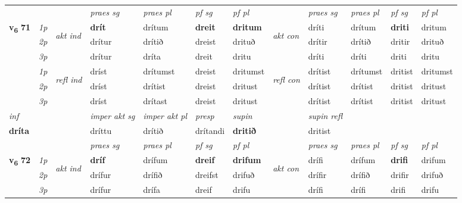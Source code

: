 \begin{longtable}[l]{X>{\footnotesize\itshape}llXXXXlXXXX}
   \midrule
 & &   & \textit{praes sg}  & \textit{praes pl}    & \textit{ pf sg} & \textit{pf pl} & & \textit{praes sg}  & \textit{praes pl}    & \textit{pf sg} & \textit{pf pl }  \\ \cmidrule{4-7} \cmidrule{9-12}
 \multirow{2}{*}{{{\textbf{v{\textsubscript{6}}} \Large{\textbf{71}}}}}  & 1p & \multirow{3}{*}{\begin{turn}{90}\textit{akt ind}\end{turn}} & \textbf{drít} & drítum & \textbf{dreit} & \textbf{dritum} & \multirow{3}{*}{\begin{turn}{90}\textit{akt con}\end{turn}} &dríti & drítum & \textbf{driti} & dritum\\*
 & 2p &  &  drítur  & drítið & dreist & drituð & & drítir & drítið & dritir & drituð \\*
 & 3p &  & drítur & dríta & dreit & dritu & & dríti & dríti& driti & dritu \\*
\cmidrule{4-7} \cmidrule{9-12}
 & 1p & \multirow{3}{*}{\begin{turn}{90}\textit{refl ind}\end{turn}}  & dríst & drítumst & dreist & dritumst & \multirow{3}{*}{\begin{turn}{90}\textit{refl con}\end{turn}}  &drítist & drítumst & dritist & dritumst \\*
 & 2p &  & dríst & drítist & dreist & dritust & &drítist & drítist & dritist & dritust \\*
 & 3p  & & dríst & drítast & dreist & dritust & & drítist & drítist& dritist & dritust \\*
\cmidrule{4-7} \cmidrule{9-12}

   {\textit{inf}} & &  & \textit{imper akt sg} & \textit{imper akt pl}   & \textit{presp} & \textit{supin} && \textit{supin refl}  \\*
  {\textbf{dríta}} & && dríttu  & drítið   & drítandi &  \textbf{dritið} && dritist  \\*

\midrule

 & &   & \textit{praes sg}  & \textit{praes pl}    & \textit{ pf sg} & \textit{pf pl} & & \textit{praes sg}  & \textit{praes pl}    & \textit{pf sg} & \textit{pf pl }  \\ \cmidrule{4-7} \cmidrule{9-12}
 \multirow{2}{*}{{{\textbf{v{\textsubscript{6}}} \Large{\textbf{72}}}}}  & 1p & \multirow{3}{*}{\begin{turn}{90}\textit{akt ind}\end{turn}} & \textbf{dríf} & drífum & \textbf{dreif} & \textbf{drifum} & \multirow{3}{*}{\begin{turn}{90}\textit{akt con}\end{turn}} &drífi & drífum & \textbf{drifi} & drifum\\*
 & 2p &  &  drífur  & drífið & dreifst & drifuð & & drífir & drífið & drifir & drifuð \\*
 & 3p &  & drífur & drífa & dreif & drifu & & drífi & drífi& drifi & drifu \\*
\cmidrule{4-7} \cmidrule{9-12}


\end{longtable}
